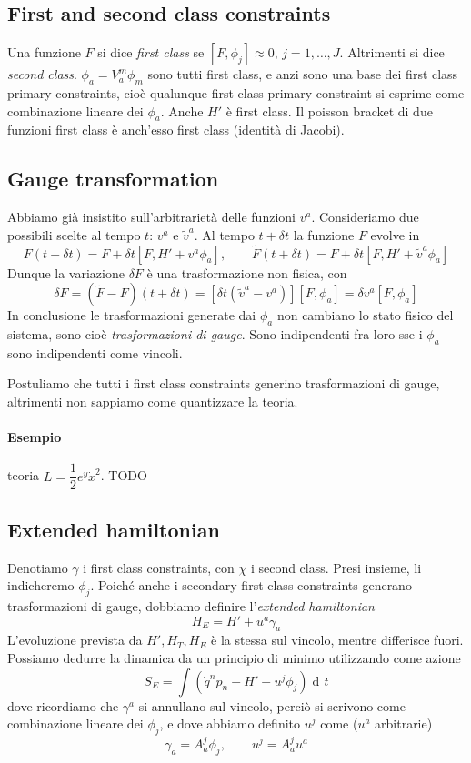 \documentclass[a4paper, 11pt]{article}
\newcommand{\dd}{\mathop{\mathrm{d}\!}{}}
\begin{document}
	\subsection{First and second class constraints}
	Una funzione $F$ si dice \emph{first class} se $[F, \phi_j] \approx 0,\, j=1,\dots,J$. Altrimenti si dice \emph{second class}.
	$\phi_a=V_a^m\phi_m$ sono tutti first class, e anzi sono una base dei first class primary constraints, cioè qualunque first class primary constraint si esprime come combinazione lineare dei $\phi_a$. Anche $H'$ è first class. Il poisson bracket di due funzioni first class è anch'esso first class (identità di Jacobi).
	
	\subsection{Gauge transformation}
	Abbiamo già insistito sull'arbitrarietà delle funzioni $v^a$. Consideriamo due possibili scelte al tempo $t$: $v^a$ e $\tilde{v}^a$. Al tempo $t+\delta t$ la funzione $F$ evolve in
	\[ F(t+\delta t) = F + \delta t [F, H'+v^a\phi_a],\qquad \tilde{F}(t+\delta t) = F + \delta t [F, H'+\tilde{v}^a\phi_a] \]
	Dunque la variazione $\delta F$ è una trasformazione non fisica, con
	\[ \delta F = (\tilde{F}-F)(t+\delta t) = [\delta t (\tilde{v}^a - v^a)] [F, \phi_a] = \delta v^a [F, \phi_a]\]
	In conclusione le trasformazioni generate dai $\phi_a$ non cambiano lo stato fisico del sistema, sono cioè \emph{trasformazioni di gauge}.
	Sono indipendenti fra loro sse i $\phi_a$ sono indipendenti come vincoli.
	
	Postuliamo che tutti i first class constraints generino trasformazioni di gauge, altrimenti non sappiamo come quantizzare la teoria.
	\paragraph{Esempio} teoria $L = \dfrac{1}{2} e^y \dot{x}^2$. TODO
	
	\subsection{Extended hamiltonian}
	Denotiamo $\gamma$ i first class constraints, con $\chi$ i second class. Presi insieme, li indicheremo $\phi_j$.
	Poiché anche i secondary first class constraints generano trasformazioni di gauge, dobbiamo definire l'\emph{extended hamiltonian}
	\[ H_E = H' + u^a \gamma_a \]
	L'evoluzione prevista da $H',H_T,H_E$ è la stessa sul vincolo, mentre differisce fuori. Possiamo dedurre la dinamica da un principio di minimo utilizzando come azione
	\[ S_E = \int (\dot{q}^n p_n - H' - u^j \phi_j) \dd t \]
	dove ricordiamo che $\gamma^a$ si annullano sul vincolo, perciò si scrivono come combinazione lineare dei $\phi_j$, e dove abbiamo definito $u^j$ come ($u^a$ arbitrarie)
	\[ \gamma_a = A_a^j \phi_j,\qquad u^j = A_a^j u^a \]
	
\end{document}

